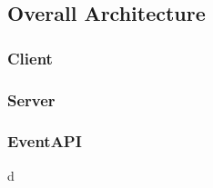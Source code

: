 \subsection{Overall Architecture}

\subsubsection{Client}

\subsubsection{Server}

\subsubsection{EventAPI}d